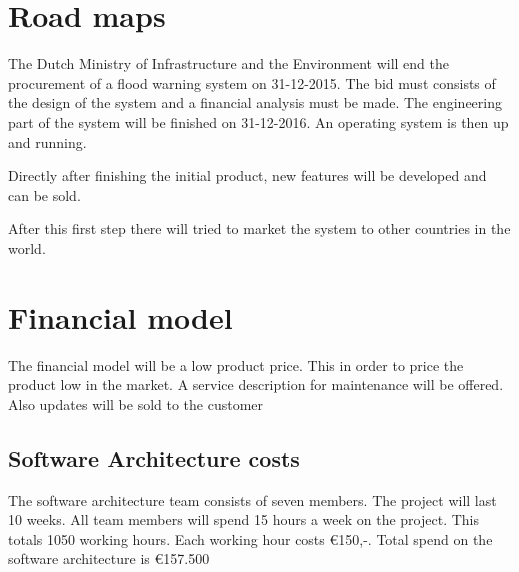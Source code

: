 
\section{Road maps}
The Dutch Ministry of Infrastructure and the Environment will end the procurement of a flood warning system on 31-12-2015. The bid must consists of the design of the system and a financial analysis must be made. The engineering part of the system will be finished on 31-12-2016. An operating system is then up and running.

Directly after finishing the initial product, new features will be developed and can be sold.

After this first step there will tried to market the system to other countries in the world. 

\section{Financial model}
The financial model will be a low product price. This in order to price the product low in the market. A service description for maintenance will be offered. Also updates will be sold to the customer

\subsection{Software Architecture costs}
The software architecture team consists of seven members. The project will last 10 weeks. All team members will spend 15 hours a week on the project. This totals 1050 working hours. Each working hour costs \euro{}150,-. Total spend on the software architecture is \euro{}157.500

